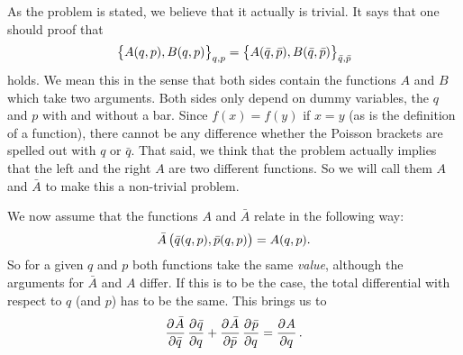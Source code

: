 \documentclass[11pt, ngerman, fleqn, DIV=15, headinclude, BCOR=1cm]{scrartcl}
\begin{document}
As the problem is stated, we believe that it actually is trivial. It says that
one should proof that
\[
    \cbr{A(q, p), B(q, p)}_{q,p} = \cbr{A(\bar q, \bar p), B(\bar q, \bar
    p)}_{\bar q,\bar p}
\]
holds. We mean this in the sense that both sides contain the functions $A$ and
$B$ which take two arguments. Both sides only depend on dummy variables, the
$q$ and $p$ with and without a bar. Since $f(x) = f(y)$ if $x = y$ (as is the
definition of a function), there cannot be any difference whether the Poisson
brackets are spelled out with $q$ or $\bar q$. That said, we think that the
problem actually implies that the left and the right $A$ are two different
functions. So we will call them $A$ and $\bar A$ to make this a non-trivial
problem.

We now assume that the functions $A$ and $\bar A$ relate in the following way:
\[
    \bar A\del{\bar q(q, p), \bar p(q, p)} = A(q, p).
\]
So for a given $q$ and $p$ both functions take the same \emph{value}, although
the arguments for $\bar A$ and $A$ differ. If this is to be the case, the total
differential with respect to $q$ (and $p$) has to be the same. This brings us
to
\[
    \dpd{\bar A}{\bar q} \dpd{\bar q}q + \dpd{\bar A}{\bar p} \dpd{\bar p}q =
    \dpd Aq.
\]
\end{document}
